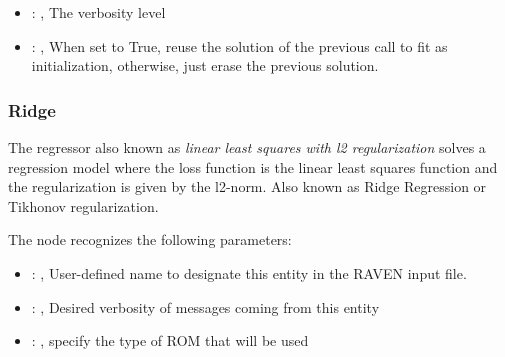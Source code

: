 \begin{itemize}
    \item {}: , 
      The verbosity level

    \item {}: , 
      When set to True, reuse the solution of the previous call
      to fit as initialization, otherwise, just erase the previous solution.
  \end{itemize}


\subsubsection{Ridge}
  The  regressor also known as                              \textit{linear least
  squares with l2 regularization} solves a regression                              model where the
  loss function is the linear least squares function and the
  regularization is given by the l2-norm.                              Also known as Ridge
  Regression or Tikhonov regularization.

  The  node recognizes the following parameters:
    \begin{itemize}
      \item {}: , 
        User-defined name to designate this entity in the RAVEN input file.
      \item {}: , 
        Desired verbosity of messages coming from this entity
      \item {}: , 
        specify the type of ROM that will be used
  \end{itemize}

